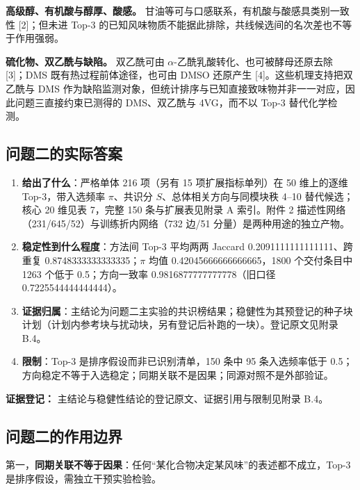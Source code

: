 \documentclass[11pt,a4paper]{article}
\providecommand{\tightlist}{%
  \setlength{\itemsep}{0pt}\setlength{\parskip}{0pt}}
\begin{document}
\textbf{高级醇、有机酸与醇厚、酸感。}
甘油等可与口感联系，有机酸与酸感具类别一致性 {[}2{]}；但未进 Top-3
的已知风味物质不能据此排除，共线候选间的名次差也不等于作用强弱。

\textbf{硫化物、双乙酰与缺陷。} 双乙酰可由
\(\alpha\)-乙酰乳酸转化、也可被酵母还原去除 {[}3{]}；DMS
既有热过程前体途径，也可由 DMSO 还原产生 {[}4{]}。这些机理支持把双乙酰与
DMS
作为缺陷监测对象，但统计排序与已知直接致味物并非一一对应，因此问题三直接约束已测得的
DMS、双乙酰与 4VG，而不以 Top-3 替代化学检测。

\subsection{问题二的实际答案}\label{ux95eeux9898ux4e8cux7684ux5b9eux9645ux7b54ux6848}

\begin{enumerate}
\def\labelenumi{\arabic{enumi}.}
\tightlist
\item
  \textbf{给出了什么}：严格单体 216 项（另有 15 项扩展指标单列）在 50
  维上的逐维 Top-3，带入选频率 \(\pi\)、共识分
  \(S\)、总体相关方向与同模块秩 4--10 替代候选；核心 20 维见表 7，完整
  150 条与扩展表见附录 A 索引。附件 2
  描述性网络（231/645/52）与训练折内网络（732 边/51
  分量）是两种用途的独立产物。
\item
  \textbf{稳定性到什么程度}：方法间 Top-3 平均两两 Jaccard
  0.2091111111111111、跨重复 0.8748333333333335；\(\pi\) 均值
  0.42045666666666665，1800 个交付条目中 1263 个低于 0.5；方向一致率
  0.9816877777777778（旧口径 0.7225544444444444）。
\item
  \textbf{证据归属}：主结论为问题二主实验的共识榜结果；稳健性为其预登记的种子块计划（计划内参考块与扰动块，另有登记后补跑的一块）。登记原文见附录
  B.4。
\item
  \textbf{限制}：Top-3 是排序假设而非已识别清单，150 条中 95
  条入选频率低于
  0.5；方向稳定不等于入选稳定；同期关联不是因果；同源对照不是外部验证。
\end{enumerate}

\textbf{证据登记：} 主结论与稳健性结论的登记原文、证据引用与限制见附录
B.4。

\subsection{问题二的作用边界}\label{ux95eeux9898ux4e8cux7684ux4f5cux7528ux8fb9ux754c}

第一，\textbf{同期关联不等于因果}：任何``某化合物决定某风味''的表述都不成立，Top-3
是排序假设，需独立干预实验检验。
\end{document}
